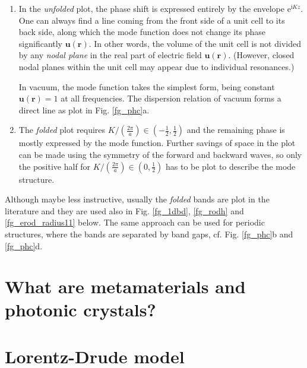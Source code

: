 \documentclass[letterpaper,12pt]{report}
\begin{document}
\begin{enumerate}
 \item{In the \textit{unfolded} plot, the phase shift is expressed entirely by the envelope $\mathrm{e}^{\mathrm{i}Kz}$. One can always find a line coming from the front side of a unit cell to its back side, along which the mode function does not change its phase significantly $\mathbf{u(\mathbf{r})}$. In other words, the volume of the unit cell is not divided by any \textit{nodal plane} in the real part of electric field  $\mathbf{u(\mathbf{r})}$. (However, closed nodal planes within the unit cell may appear due to individual resonances.)

In vacuum, the mode function takes the simplest form, being constant $\mathbf{u(\mathbf{r})} = 1$ at all frequencies. The dispersion relation of vacuum forms a direct line as plot in Fig. \ref{fg_phc}a.} 
 \item{The \textit{folded} plot requires $K/\left(\frac{2\pi}{a}\right) \in (-\frac{1}{2}, \frac{1}{2})$ and the remaining phase is mostly expressed by the mode function. 
Further savings of space in the plot can be made using the symmetry of the forward and backward waves, so only the positive half for $K/\left(\frac{2\pi}{a}\right) \in (0, \frac{1}{2})$ has to be plot to describe the mode structure.} 
 \end{enumerate}
Although maybe less instructive, usually the \textit{folded} bands are plot in the literature and they are used also in Fig. \ref{fg_1dbd}, \ref{fg_rodh} and \ref{fg_erod_radius11} below. The same approach can be used for periodic structures, where the bands are separated by band gaps, cf. Fig. \ref{fg_phc}b and \ref{fg_phc}d.

\section{What are metamaterials and photonic crystals?} 

\section{Lorentz-Drude model}
\end{document}
